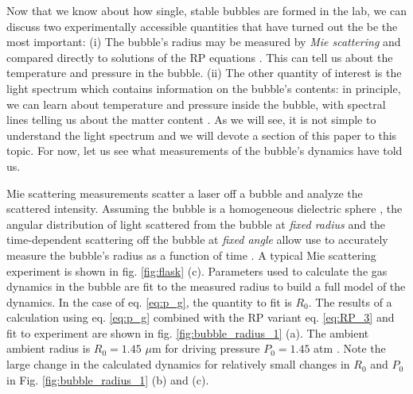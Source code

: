 \documentclass[prb,aps,nofootinbib,superscriptaddress,floatfix]{revtex4-2}
\begin{document}
Now that we know about how single, stable bubbles are formed in the lab, we can discuss two experimentally accessible quantities that have turned out the be the most important: (i) The bubble's radius may be measured by \emph{Mie scattering} and compared directly to solutions of the RP equations \cite{barber1992light,barber1997defining,brenner2002single}. This can tell us about the temperature and pressure in the bubble. (ii) The other quantity of interest is the light spectrum which contains information on the bubble's contents: in principle, we can learn about temperature and pressure inside the bubble, with spectral lines telling us about the matter content \cite{hiller1992spectrum,hilgenfeldt1999simple,flannigan2005plasma,flannigan2006measurement}. As we will see, it is not simple to understand the light spectrum and we will devote a section of this paper to this topic. For now, let us see what measurements of the bubble's dynamics have told us. 

Mie scattering measurements scatter a laser off a bubble and analyze the scattered intensity. Assuming the bubble is a homogeneous dielectric sphere \cite{jackson1999classical}, the angular distribution of light scattered from the bubble at \emph{fixed radius} and the time-dependent scattering off the bubble at \emph{fixed angle} allow use to accurately measure the bubble's radius as a function of time \cite{brenner2002single}. A typical Mie scattering experiment is shown in fig. \ref{fig:flask} (c). Parameters used to calculate the gas dynamics in the bubble are fit to the measured radius to build a full model of the dynamics. In the case of eq. \ref{eq:p_g}, the quantity to fit is $R_0$. The results of a calculation using eq. \ref{eq:p_g} combined with the RP variant eq. \ref{eq:RP_3} and fit to experiment are shown in fig. \ref{fig:bubble_radius_1} (a). The ambient ambient radius is $R_0=1.45$ $\mu$m for driving pressure $P_0=1.45$ atm \cite{barber1997defining,barber1992light}. Note the large change in the calculated dynamics for relatively small changes in $R_0$ and $P_0$ in Fig. \ref{fig:bubble_radius_1} (b) and (c). 
\end{document}
